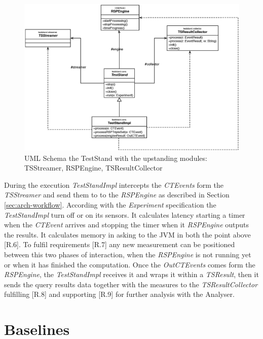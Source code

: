 \begin{figure}[tbh]
  \centering
	\includegraphics[width=0.90\linewidth]{images/uml_teststand_modules}
	\caption{UML Schema the TestStand with the upstanding modules: TSStreamer, RSPEngine, TSResultCollector} 
  	\label{fig:uml_teststand_modules}
\end{figure}

During the execution \textit{TestStandImpl} intercepts the \textit{CTEvents} form the \textit{TSStreamer} and send them to to the \textit{RSPEngine} as described in Section \ref{sec:arch-workflow}. According with the \textit{Experiment} specification the \textit{TestStandImpl} turn off or on its sensors. It calculates latency starting a timer when the \textit{CTEvent} arrives and stopping the timer when it \textit{RSPEngine} outputs the results. It calculates memory in asking to the JVM in both the point above [R.6]. To fulfil requirements [R.7] any new measurement can be positioned between this two phases of interaction, when the \textit{RSPEngine} is not running yet or when it has finished the computation. Once the \textit{OutCTEvents} comes form the \textit{RSPEngine}, the \textit{TestStandImpl} receives it and wraps it within a \textit{TSResult}, then it sends the query results data together with the measures to the \textit{TSResultCollector} fulfilling [R.8] and supporting [R.9] for further analysis with the Analyser.
%

\section{Baselines}\label{sec:baselines-impl}

